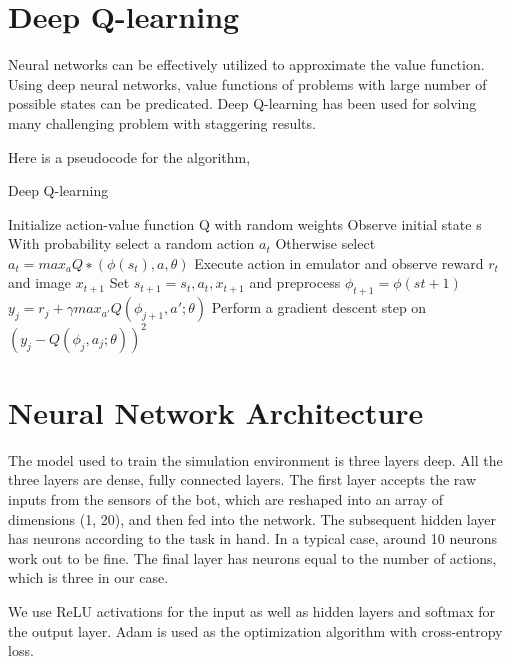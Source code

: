 \documentclass[12pt]{extreport}
\theoremstyle{plain}
\theoremstyle{definition}
\begin{document}
\section{Deep Q-learning}

Neural networks can be effectively utilized to approximate the value function.
Using deep neural networks, value functions of problems with large number of
possible states can be predicated. Deep Q-learning has been used for solving
many challenging problem with staggering results.

Here is a pseudocode for the algorithm,

\begin{algorithm}
 \caption{Deep Q-learning}\label{q-learning}
 \begin{algorithmic}[1]
  \State Initialize action-value function Q with random weights
  \State Observe initial state s
  \State With probability select a random action $ a_t $
  \State Otherwise select $ a_t = max_a Q ∗ (\phi(s_t), a, \theta) $
  \State Execute action in emulator and observe reward $ r_t $ and image $ x_{t+1} $
  \State Set $ s_{t+1} = s_t, a_t, x_{t+1} $ and preprocess $ \phi_{t+1} = \phi(st+1) $
  \State $ y_j = r_j + \gamma max_{a'} Q(\phi_{j+1}, a'; \theta) $
  \State Perform a gradient descent step on $ (y_j - Q(\phi_j , a_j ; \theta))^2 $
  \EndFor
  \EndFor
 \end{algorithmic}
\end{algorithm}

\section{Neural Network Architecture}
The model used to train the simulation environment is three layers deep. All the three layers are dense, fully connected layers. The first layer accepts the raw inputs from the sensors of the bot, which are reshaped into an array of dimensions (1, 20), and then fed into the network. The subsequent hidden layer has neurons according to the task in hand. In a typical case, around 10 neurons work out to be fine. The final layer has neurons equal to the number of actions, which is three in our case.

We use ReLU activations for the input as well as hidden layers and softmax for the output layer. Adam is used as the optimization algorithm with cross-entropy loss.
\end{document}
